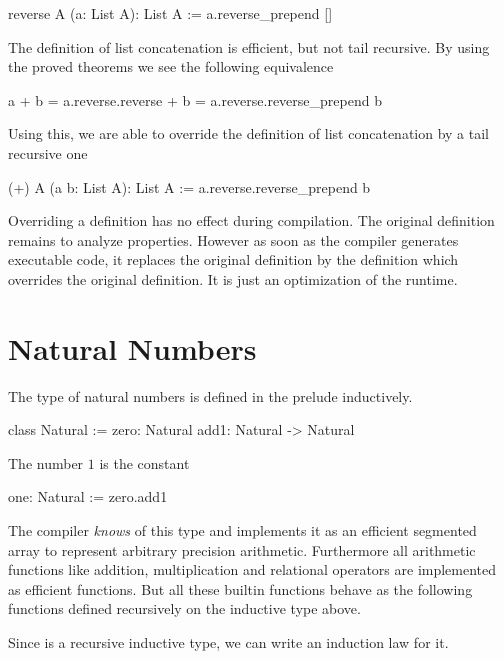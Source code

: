 \begin{alba}
  reverse A (a: List A): List A :=
    a.reverse_prepend []
\end{alba}

The definition of list concatenation is efficient, but not tail recursive. By
using the proved theorems we see the following equivalence
%
\begin{alba}
  a + b   =  a.reverse.reverse + b
          =  a.reverse.reverse_prepend b
\end{alba}

Using this, we are able to override the definition of list concatenation by a
tail recursive one

\begin{alba}
  (+) A (a b: List A): List A :=
    a.reverse.reverse_prepend b
\end{alba}

Overriding a definition has no effect during compilation. The original
definition remains to analyze properties. However as soon as the compiler
generates executable code, it replaces the original definition by the
definition which overrides the original definition. It is just an optimization
of the runtime.





\section{Natural Numbers}


The type of natural numbers is defined in the prelude inductively.

\begin{alba}
  class Natural :=
    zero: Natural
    add1: Natural -> Natural
\end{alba}

The number $1$ is the constant

\begin{alba}
  one: Natural := zero.add1
\end{alba}

The compiler \emph{knows} of this type and implements it as an efficient
segmented array to represent arbitrary precision arithmetic. Furthermore all
arithmetic functions like addition, multiplication and relational operators
are implemented as efficient functions. But all these builtin functions behave
as the following functions defined recursively on the inductive type above.

Since  is a recursive inductive type, we can write an induction
law for it.


